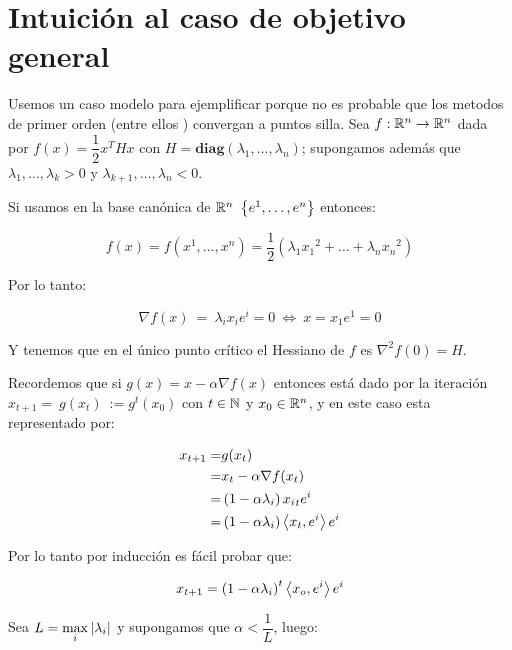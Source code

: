 \chapter{Intuici\'on al caso de objetivo general}\label{ch:intuicion}

Usemos un caso modelo para ejemplificar porque no es probable que los metodos de primer orden (entre ellos \dg) convergan a puntos silla. Sea $f: {\mathbb{R}}^n \rightarrow {\mathbb{R}}^n$ dada por $f(x) = \dfrac{1}{2} x^THx$ con $H = \textbf{diag}\left(\lambda_1, \dots, \lambda_n\right)$; supongamos adem\'as que $\lambda_1, \dots, \lambda_k > 0$ y $\lambda_{k+1}, \dots, \lambda_n <0$.


Si usamos en la base can\'onica de $\R^n \ \sett{e^1, \dots, e^n}$ entonces:

\begin{equation*}
f(x) = f(x^1, \dots, x^n) = \dfrac{1}{2} \left(\lambda_1 {x_1}^2 + \dots + \lambda_n {x_n}^2\right)
\end{equation*}

Por lo tanto:

\begin{equation*}
\nabla f (x) \ = \ \lambda_i x_i e^i = 0 \ \Longleftrightarrow \ x = x_1 e^1 = 0
\end{equation*}


Y tenemos que en el \'unico punto cr\'itico el Hessiano de $f$ es $\nabla^2 f (0) =  H$.

Recordemos que si $g(x) = x - \alpha  \nabla f(x)$ entonces \dg  est\'a dado por la iteraci\'on $x_{t+1} = \ g(x_t) \ := g^t(x_0)$ con $t \in {\mathbb{N}}$ y $x_0 \in {\mathbb{R}}^n$, y en este caso esta representado por:

\begin{equation*}
\begin{aligned}
x_{t+1} = & g(x_t) \\
= & x_t - \alpha\nabla f(x_t) \\
= & \left(1 - \alpha\lambda_i\right){x_i}_te^i \\
= & \left(1 - \alpha\lambda_i\right)\left\langle x_t, e^i\right\rangle e^i
\end{aligned}
\end{equation*}

Por lo tanto por inducci\'on es f\'acil probar que:


\begin{equation*}
x_{t+1} = \left(1 - \alpha\lambda_i\right)^t\left\langle x_o, e^i\right\rangle e^i
\end{equation*}

Sea $L = \max\limits_i\left\lvert\lambda_i\right\rvert$ y supongamos que $\alpha < \dfrac{1}{L}$, luego:

